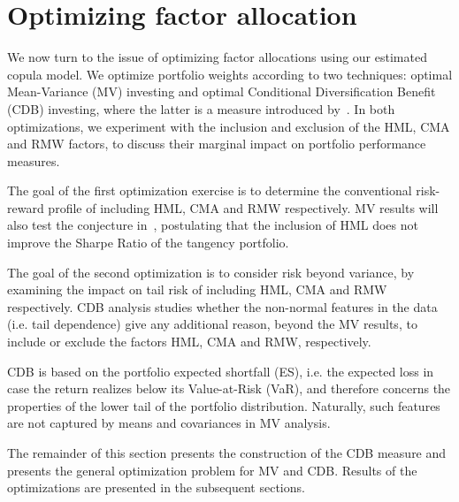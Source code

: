 
\section{Optimizing factor allocation} %
\label{sec:optimizing_factor_allocations}

We now turn to the issue of optimizing factor allocations using our estimated copula model. We optimize portfolio weights according to two techniques: optimal Mean-Variance (MV) investing and optimal Conditional Diversification Benefit (CDB) investing, where the latter is a measure introduced by~\textcite{ChristoffersenErrunzaJacobLanglois2012}. In both optimizations, we experiment with the inclusion and exclusion of the HML, CMA and RMW factors, to discuss their marginal impact on portfolio performance measures.

The goal of the first optimization exercise is to determine the conventional risk-reward profile of including HML, CMA and RMW respectively. MV results will also test the conjecture in~\textcite{FF2015}, postulating that the inclusion of HML does not improve the Sharpe Ratio of the tangency portfolio. 

The goal of the second optimization is to consider risk beyond variance, by examining the impact on tail risk of including HML, CMA and RMW respectively. CDB analysis studies whether the non-normal features in the data (i.e. tail dependence) give any additional reason, beyond the MV results, to include or exclude the factors HML, CMA and RMW, respectively.

CDB is based on the portfolio expected shortfall (ES), i.e. the expected loss in case the return realizes below its Value-at-Risk (VaR), and therefore concerns the properties of the lower tail of the portfolio distribution. Naturally, such features are not captured by means and covariances in MV analysis.

The remainder of this section presents the construction of the CDB measure and presents the general optimization problem for MV and CDB. Results of the optimizations are presented in the subsequent sections.


